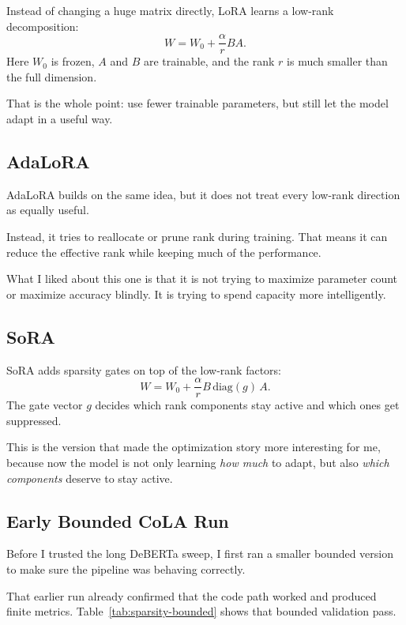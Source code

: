 \documentclass[11pt]{article}
\begin{document}
Instead of changing a huge matrix directly, LoRA learns a low-rank decomposition:
\[
  W = W_0 + \frac{\alpha}{r}BA.
\]
Here $W_0$ is frozen, $A$ and $B$ are trainable, and the rank $r$ is much smaller than the full dimension.

That is the whole point: use fewer trainable parameters, but still let the model adapt in a useful way.

\subsection{AdaLoRA}
AdaLoRA builds on the same idea, but it does not treat every low-rank direction as equally useful.

Instead, it tries to reallocate or prune rank during training. That means it can reduce the effective rank while keeping much of the performance.

What I liked about this one is that it is not trying to maximize parameter count or maximize accuracy blindly. It is trying to spend capacity more intelligently.

\subsection{SoRA}
SoRA adds sparsity gates on top of the low-rank factors:
\[
  W = W_0 + \frac{\alpha}{r}B\,\mathrm{diag}(g)\,A.
\]
The gate vector $g$ decides which rank components stay active and which ones get suppressed.

This is the version that made the optimization story more interesting for me, because now the model is not only learning \emph{how much} to adapt, but also \emph{which components} deserve to stay active.

\subsection{Early Bounded CoLA Run}
Before I trusted the long DeBERTa sweep, I first ran a smaller bounded version to make sure the pipeline was behaving correctly.

That earlier run already confirmed that the code path worked and produced finite metrics. Table~\ref{tab:sparsity-bounded} shows that bounded validation pass.
\end{document}
